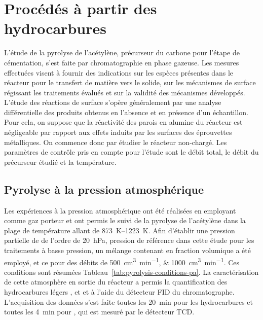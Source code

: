 \section{Procédés à partir des hydrocarbures}
\label{sec:pyrolyse_acetylene}

L'étude de la pyrolyse de l'acétylène, précurseur du carbone pour l'étape de cémentation, s'est faite par chromatographie en phase gazeuse. Les mesures effectuées visent à fournir des indications sur les espèces présentes dans le réacteur pour le transfert de matière vers le solide, sur les mécanismes de surface régissant les traitements évalués et sur la validité des mécanismes développés. L'étude des réactions de surface s'opère généralement par une analyse différentielle des produits obtenus en l'absence et en présence d'un échantillon. Pour cela, on suppose que la réactivité des parois en alumine du réacteur est négligeable par rapport aux effets induits par les surfaces des éprouvettes métalliques.  On commence donc par étudier le réacteur non-chargé. Les paramètres de contrôle pris en compte pour l'étude sont le débit total, le débit du précurseur étudié et la température. %

\subsection{Pyrolyse à la pression atmosphérique}

Les expériences à la pression atmosphérique ont été réalisées en employant  comme gaz porteur et ont permis le suivi de la pyrolyse de l'acétylène dans la plage de température allant de \SIrange{873}{1223}{\kelvin}. Afin d'établir une pression partielle de  de l'ordre de \SI{20}{\hecto\pascal}, pression de référence dans cette étude pour les traitements à basse pression, un mélange contenant  en fraction volumique a été employé, et ce pour des débits de \SIlist{500;1000}{\cubic\centi\metre\per\minute}. Ces conditions sont résumées Tableau~\ref{tab:pyrolysis-conditions-pa}. La caractérisation de cette atmosphère en sortie du réacteur a permis la quantification des hydrocarbures légers ,  et  et  à l'aide du détecteur FID du chromatographe. L'acquisition des données s'est faite toutes les \SI{20}{\minute} pour les hydrocarbures et toutes les \SI{4}{\minute} pour , qui est mesuré par le détecteur TCD. 

